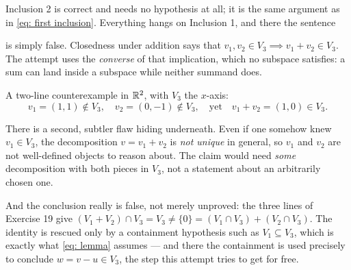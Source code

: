 \begin{ainote}
  Inclusion 2 is correct and needs no hypothesis at all; it is the same argument as in \eqref{eq: first inclusion}. Everything hangs on Inclusion 1, and there the sentence
  \begin{center}
  \end{center}
  is simply false. Closedness under addition says that $v_1, v_2 \in V_3 \implies v_1 + v_2 \in V_3$. The attempt uses the \emph{converse} of that implication, which no subspace satisfies: a sum can land inside a subspace while neither summand does.

  A two-line counterexample in $\mathbb{R}^2$, with $V_3$ the $x$-axis:
  \begin{equation}
    v_1 = (1,1) \notin V_3, \quad v_2 = (0,-1) \notin V_3, \quad \text{yet} \quad v_1 + v_2 = (1,0) \in V_3.
  \end{equation}

  There is a second, subtler flaw hiding underneath. Even if one somehow knew $v_1 \in V_3$, the decomposition $v = v_1 + v_2$ is \emph{not unique} in general, so  $v_1$ and $v_2$ are not well-defined objects to reason about. The claim would need \emph{some} decomposition with both pieces in $V_3$, not a statement about an arbitrarily chosen one.

  And the conclusion really is false, not merely unproved: the three lines of Exercise 19 give $(V_1+V_2) \cap V_3 = V_3 \neq \{0\} = (V_1 \cap V_3) + (V_2 \cap V_3)$. The identity is rescued only by a containment hypothesis such as $V_1 \subseteq V_3$, which is exactly what \eqref{eq: lemma} assumes --- and there the containment is used precisely to conclude $w = v - u \in V_3$, the step this attempt tries to get for free.
\end{ainote}
